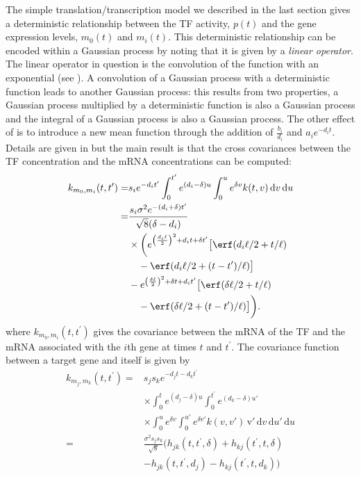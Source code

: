\documentclass{article}
\begin{document}
The simple  translation/transcription model  we described in  the last
section gives  a deterministic  relationship between the  TF activity,
$p(t)$  and the gene  expression levels,  $m_0(t)$ and  $m_i(t)$. This
deterministic relationship can be encoded within a Gaussian process by
noting  that it  is  given  by a  \emph{linear  operator}. The  linear
operator  in question  is  the  convolution of  the  function with  an
exponential  (see  ).   A  convolution  of  a
Gaussian  process  with  a  deterministic function  leads  to  another
Gaussian process: this results from two properties, a Gaussian process
multiplied by a deterministic function  is also a Gaussian process and
the integral  of a  Gaussian process is  also a Gaussian  process. The
other effect  of  is to introduce  a new mean
function through  the addition  of $\frac{b_i}{d_i}$ and  $a_i e^{-d_i
  t}$.            Details            are           given            in
\cite{Lawrence:transcriptionalGP06,Gao:latent08,Honkela:modelbased10}
but  the main  result is  that the  cross covariances  between  the TF
concentration and the mRNA concentrations can be computed:
\begin{align*}
  k_{m_0, m_i}(t, t^\prime) = & s_i e^{-d_i t^\prime} \int_0^{t^\prime}
  e^{(d_i - \delta) u} \int_0^u e^{\delta v} k(t, v)\, \mathrm{d}v\, \mathrm{d}u \\
  = & \frac{s_i \sigma^2e^{-(d_i+\delta) t^\prime}}{\sqrt{8}(\delta - d_i)} \\
  &\times\bigg( e^{\left(\frac{d_i \ell}{2}\right)^2 + d_i t +
    \delta t^\prime }
  \big[\erf(d_i \ell / 2 + t/\ell) \\
  &\quad - \erf(d_i \ell / 2 + (t-t^\prime)/\ell)\big] \\
  &-e^{\left(\frac{\delta \ell}{2}\right)^2 + \delta t + d_i
    t^\prime} \big[\erf(\delta \ell / 2 + t/\ell) \\
  &\quad- \erf(\delta \ell / 2 +
  (t-t^\prime)/\ell)\big] \bigg).
\end{align*}
where $k_{m_0,m_i}(t, t^\prime)$ gives the covariance between the mRNA
of the TF and the mRNA associated with the $i$th gene at times $t$ and
$t^\prime$.  The covariance function between a target gene and itself is given by
\begin{align*}
  k_{m_j, m_k}(t, t^\prime) = &s_j s_k e^{-d_j t - d_k t^\prime}\\
  &\times\int_0^t e^{(d_j - \delta) u}
  \int_0^{t^\prime} e^{(d_k - \delta) u'} \\
  &\times
  \int_0^u e^{\delta v} \int_0^{u'} e^{\delta v'} k(v, v') \, \mathrm{v}'\, \mathrm{d}v\, \mathrm{d}u'\, \mathrm{d}u \\
  = &\frac{\sigma^2 s_j s_k}{\sqrt{8}} \bigg(
  h_{jk}(t, t^\prime, \delta) + h_{kj}(t^\prime, t, \delta) \\
  &- h_{jk}(t, t^\prime, d_j) - h_{kj}(t^\prime, t, d_k)
  \bigg)
\end{align*}
\end{document}
